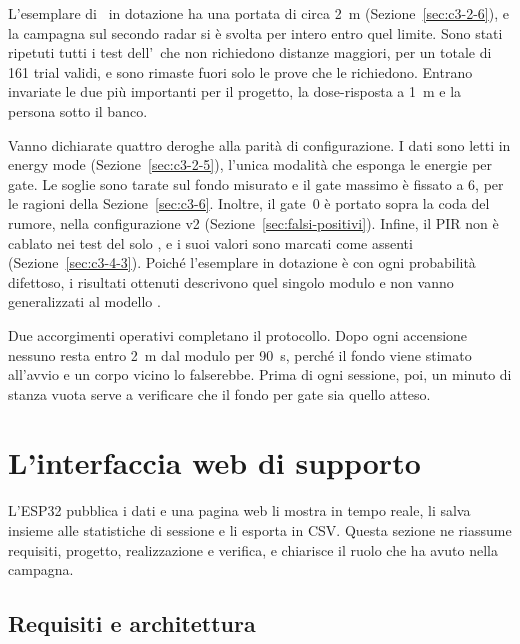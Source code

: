 L'esemplare di \ldc\ in dotazione ha una portata di circa 2~m (Sezione~\ref{sec:c3-2-6}),
e la campagna sul secondo radar si è svolta per intero entro quel limite. Sono stati
ripetuti tutti i test dell'\ldb\ che non richiedono distanze maggiori, per un totale di 161
trial validi, e sono rimaste fuori solo le prove che le richiedono. Entrano invariate le due
più importanti per il progetto, la dose-risposta a 1~m e la persona sotto il banco.

Vanno dichiarate quattro deroghe alla parità di configurazione. I dati sono letti in
energy mode (Sezione~\ref{sec:c3-2-5}), l'unica modalità che esponga le energie per gate.
Le soglie sono tarate sul fondo misurato e il gate massimo è fissato a 6, per le ragioni
della Sezione~\ref{sec:c3-6}. Inoltre, il gate~0 è portato sopra la coda del rumore, nella
configurazione v2 (Sezione~\ref{sec:falsi-positivi}). Infine, il PIR non è cablato nei
test del solo \ldc, e i suoi valori sono marcati come assenti (Sezione~\ref{sec:c3-4-3}).
Poiché l'esemplare in dotazione è con ogni probabilità difettoso, i risultati ottenuti descrivono quel singolo modulo e non vanno
generalizzati al modello \ldc.

Due accorgimenti operativi completano il protocollo. Dopo ogni accensione nessuno resta
entro 2~m dal modulo per 90~s, perché il fondo viene stimato all'avvio e un corpo vicino lo
falserebbe. Prima di ogni sessione, poi, un minuto di stanza vuota serve a verificare che
il fondo per gate sia quello atteso.

\section{L'interfaccia web di supporto}
\label{sec:webui}
\label{chap:webui}

L'ESP32 pubblica i dati e una pagina web li mostra in tempo reale, li salva insieme alle
statistiche di sessione e li esporta in CSV. Questa sezione ne riassume requisiti, progetto, realizzazione e verifica,
e chiarisce il ruolo che ha avuto nella campagna.

\subsection{Requisiti e architettura}
\label{sec:webui-requisiti}

